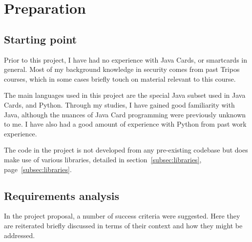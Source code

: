 \documentclass[12pt]{article}
\begin{document}
\pagebreak
\section{Preparation}

\subsection{Starting point}
Prior to this project, I have had no experience with Java Cards, or smartcards in general. Most of my background knowledge in security comes from past Tripos courses, which in some cases briefly touch on material relevant to this course.

The main languages used in this project are the special Java subset used in Java Cards, and Python. Through my studies, I have gained good familiarity with Java, although the nuances of Java Card programming were previously unknown to me. I have also had a good amount of experience with Python from past work experience.

The code in the project is not developed from any pre-existing codebase but does make use of various libraries, detailed in section~\ref{subsec:libraries}, page~\ref{subsec:libraries}.


\subsection{Requirements analysis}
\label{sec:requirements}

In the project proposal, a number of success criteria were suggested. Here they are reiterated briefly discussed in terms of their context and how they might be addressed.
\end{document}
